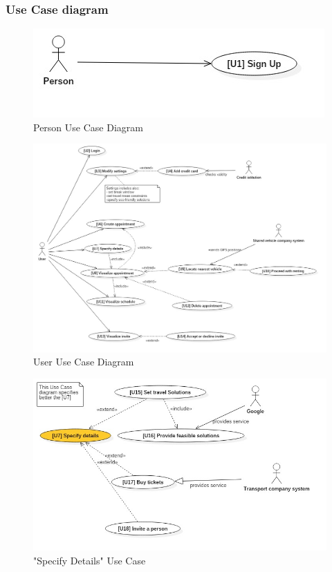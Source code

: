 	\subsubsection{Use Case diagram}
		\smallskip
		\begin{figure}[H]	
			\centerline{\includegraphics[scale= 0.7]{Images/UseCaseDiagram0}}
			\caption{Person Use Case Diagram}
		\end{figure}
		\begin{figure}[H]	
			\centerline{\includegraphics[width=\paperwidth~]{Images/UseCaseDiagram1}}
			\caption{User Use Case Diagram}
		\end{figure}

	\begin{figure}[H]	
	\centerline{\includegraphics[width=\paperwidth~]{Images/UseCaseDiagram2}}
	\caption{ "Specify Details" Use Case }
\end{figure}
		\renewcommand{\arraystretch}{1.6} %
		
